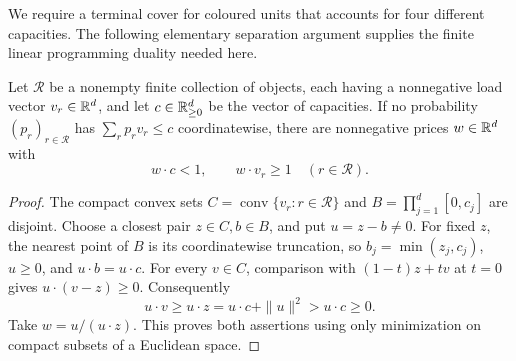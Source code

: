 We require a terminal cover for coloured units that accounts for
four different capacities.  The following elementary separation
argument supplies the finite linear programming duality needed here.

\begin{lemma}\label{gt:prices}
Let \(\mathcal R\) be a nonempty finite collection of objects, each
having a nonnegative load vector \(v_r\in\mathbb R^d\), and let
\(c\in\mathbb R_{\ge0}^d\) be the vector of capacities.  If no probability
\((p_r)_{r\in\mathcal R}\) has \(\sum_rp_rv_r\le c\)
coordinatewise, there are nonnegative prices \(w\in\mathbb R^d\) with
\[
 w\cdot c<1,\qquad w\cdot v_r\ge1\quad(r\in\mathcal R).
\]
\end{lemma}
\begin{proof}
The compact convex sets
\(C=\operatorname{conv}\{v_r:r\in\mathcal R\}\) and
\(B=\prod_{j=1}^d[0,c_j]\) are disjoint.  Choose a closest pair
\(z\in C,b\in B\), and put \(u=z-b\ne0\).  For fixed \(z\),
the nearest point of \(B\) is its coordinatewise truncation, so
\(b_j=\min(z_j,c_j)\), \(u\ge0\), and \(u\cdot b=u\cdot c\).
For every \(v\in C\), comparison with \((1-t)z+tv\) at
\(t=0\) gives \(u\cdot(v-z)\ge0\).  Consequently
\[
 u\cdot v\ge u\cdot z
   =u\cdot c+\|u\|^2>u\cdot c\ge0.
\]
Take \(w=u/(u\cdot z)\).  This proves both assertions using
only minimization on compact subsets of a Euclidean space.
\end{proof}

